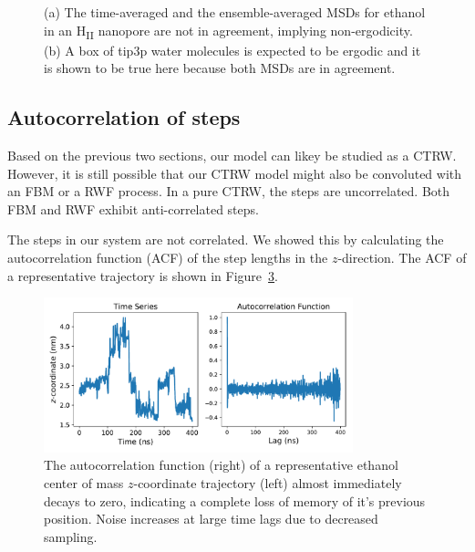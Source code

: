 \documentclass{article}
\begin{document}
\begin{figure}[!htb]
\begin{subfigure}{0.45\textwidth}
  \caption{}\label{fig:water_box_msd_comparison}
  \end{subfigure} 
  \caption{(a) The time-averaged and the ensemble-averaged MSDs for ethanol in
	  an H\textsubscript{II} nanopore are not in agreement, implying non-ergodicity.
	  (b) A box of tip3p water molecules is expected to be ergodic and it is shown to
	  be true here because both MSDs are in agreement. }\label{fig:msd_comparison}
  \end{figure}

  \subsection*{Autocorrelation of steps}



  Based on the previous two sections, our model can likey be studied as a CTRW. 
  However, it is still possible that our CTRW model might also be convoluted with
  an FBM or a RWF process. In a pure CTRW, the steps are uncorrelated. 
  Both FBM and RWF exhibit anti-correlated steps. 

  The steps in our system are not correlated. We showed this by calculating the
  autocorrelation function (ACF) of the step lengths in the $z$-direction. The
  ACF of a representative trajectory is shown in Figure~\ref{fig:eth_autocorrelation}.  
  
  \begin{figure}[!htb]
  \centering
  \includegraphics[width=0.8\textwidth]{eth_autocorrelation.pdf}
  \caption{The autocorrelation function (right) of a representative ethanol
	   center of mass $z$-coordinate trajectory (left) almost immediately decays to zero,
	   indicating a complete loss of memory of it's previous position. Noise increases
	   at large time lags due to decreased sampling.}\label{fig:eth_autocorrelation}
  \end{figure}

  \clearpage
  
\end{document}
